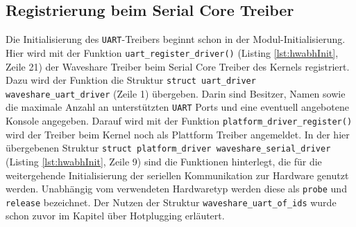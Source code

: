 \subsection{Registrierung beim Serial Core Treiber} %
Die Initialisierung des \texttt{UART}-Treibers beginnt schon in der Modul-Initialisierung. 
Hier wird mit der Funktion \texttt{uart_register_driver()} (Listing \ref{lst:hwabhInit}, Zeile 21) der Waveshare Treiber beim Serial Core Treiber des Kernels registriert. Dazu wird der Funktion die Struktur \newline
\texttt{struct uart_driver waveshare_uart_driver} (Zeile 1) übergeben. Darin sind Besitzer, Namen sowie die maximale Anzahl an unterstützten \texttt{UART} Ports und eine eventuell angebotene Konsole angegeben. 
Darauf wird mit der Funktion \texttt{platform_driver_register()} wird der Treiber beim Kernel noch als Plattform Treiber angemeldet. In der hier übergebenen Struktur \texttt{struct platform_driver waveshare_serial_driver} (Listing \ref{lst:hwabhInit}, Zeile 9) sind die Funktionen hinterlegt, die für die weitergehende Initialisierung der seriellen Kommunikation zur Hardware genutzt werden. Unabhängig vom verwendeten Hardwaretyp werden diese als \texttt{probe} und \texttt{release} bezeichnet. Der Nutzen der Struktur \texttt{waveshare\_uart\_of\_ids} wurde schon zuvor im Kapitel über Hotplugging erläutert.




